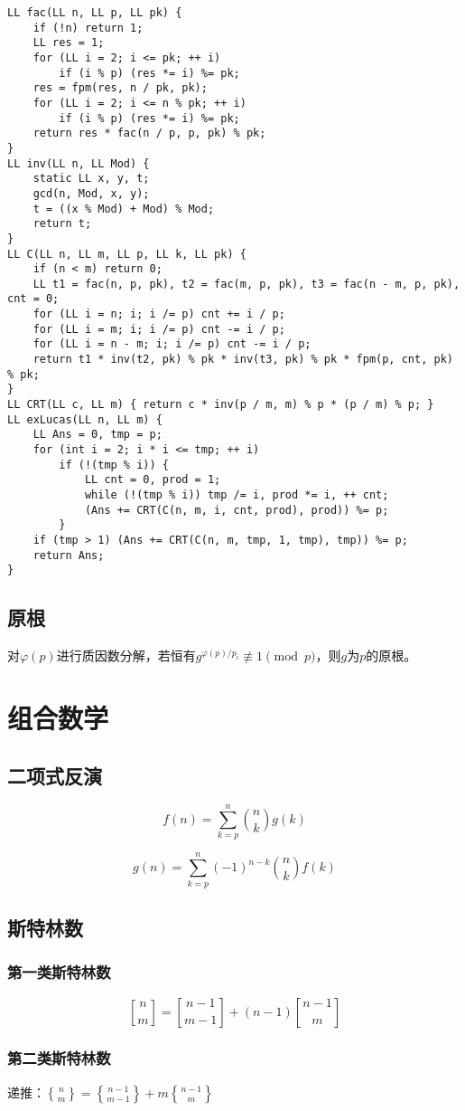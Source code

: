\documentclass[twocolumn,a4]{article}
\begin{document}
\begin{lstlisting}
LL fac(LL n, LL p, LL pk) {
	if (!n) return 1;
	LL res = 1;
	for (LL i = 2; i <= pk; ++ i)
		if (i % p) (res *= i) %= pk;
	res = fpm(res, n / pk, pk);
	for (LL i = 2; i <= n % pk; ++ i)
		if (i % p) (res *= i) %= pk;
	return res * fac(n / p, p, pk) % pk;
}
LL inv(LL n, LL Mod) {
	static LL x, y, t;
	gcd(n, Mod, x, y);
	t = ((x % Mod) + Mod) % Mod;
	return t;
}
LL C(LL n, LL m, LL p, LL k, LL pk) {
	if (n < m) return 0;
	LL t1 = fac(n, p, pk), t2 = fac(m, p, pk), t3 = fac(n - m, p, pk), cnt = 0;
	for (LL i = n; i; i /= p) cnt += i / p;
	for (LL i = m; i; i /= p) cnt -= i / p;
	for (LL i = n - m; i; i /= p) cnt -= i / p;
	return t1 * inv(t2, pk) % pk * inv(t3, pk) % pk * fpm(p, cnt, pk) % pk;
}
LL CRT(LL c, LL m) { return c * inv(p / m, m) % p * (p / m) % p; }
LL exLucas(LL n, LL m) {
	LL Ans = 0, tmp = p;
	for (int i = 2; i * i <= tmp; ++ i)
		if (!(tmp % i)) {
			LL cnt = 0, prod = 1;
			while (!(tmp % i)) tmp /= i, prod *= i, ++ cnt;
			(Ans += CRT(C(n, m, i, cnt, prod), prod)) %= p;
		}
	if (tmp > 1) (Ans += CRT(C(n, m, tmp, 1, tmp), tmp)) %= p;
	return Ans;
}
\end{lstlisting}
\subsection{原根}
对$\varphi(p)$进行质因数分解，若恒有$g^{\varphi(p)/p_i}\not \equiv 1 \pmod p$，则$g$为$p$的原根。


\section{组合数学}
\subsection{二项式反演}
$$
f(n) = \sum_{k=p}^n \binom{n}{k} g(k)
$$

$$
g(n) = \sum_{k=p}^n (-1)^{n-k} \binom{n}{k} f(k)
$$
\subsection{斯特林数}
\subsubsection{第一类斯特林数}
$$
{n \brack m} = {n-1 \brack m-1} + (n-1){n-1 \brack m}
$$
\subsubsection{第二类斯特林数}
递推：${n\brace m} = {n-1\brace m-1} + m {n-1 \brace m}$
\end{document}
